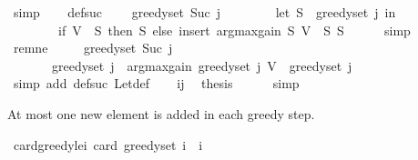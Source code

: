 \begin{isabellebody}
\ simp\isanewline
\isanewline
\ \ \isamarkupfalse%
\ def{\isacharunderscore}{\kern0pt}suc{\isacharcolon}{\kern0pt}\isanewline
\ \ \ \ {\isachardoublequoteopen}greedy{\isacharunderscore}{\kern0pt}set\ {\isacharparenleft}{\kern0pt}Suc\ j{\isacharparenright}{\kern0pt}\ {\isacharequal}{\kern0pt}\isanewline
\ \ \ \ \ \ \ {\isacharparenleft}{\kern0pt}let\ S\ {\isacharequal}{\kern0pt}\ greedy{\isacharunderscore}{\kern0pt}set\ j\ in\isanewline
\ \ \ \ \ \ \ \ if\ V\ {\isasymsubseteq}\ S\ then\ S\ else\ insert\ {\isacharparenleft}{\kern0pt}argmax{\isacharunderscore}{\kern0pt}gain\ S\ {\isacharparenleft}{\kern0pt}V\ {\isacharminus}{\kern0pt}\ S{\isacharparenright}{\kern0pt}{\isacharparenright}{\kern0pt}\ S{\isacharparenright}{\kern0pt}{\isachardoublequoteclose}\isanewline
\ \ \ \ \isamarkupfalse%
\ simp\isanewline
\isanewline
\ \ \isamarkupfalse%
\ rem{\isacharunderscore}{\kern0pt}ne\ \isamarkupfalse%
\isanewline
\ \ \ \ {\isachardoublequoteopen}greedy{\isacharunderscore}{\kern0pt}set\ {\isacharparenleft}{\kern0pt}Suc\ j{\isacharparenright}{\kern0pt}\ {\isacharequal}{\kern0pt}\isanewline
\ \ \ \ \ \ \ greedy{\isacharunderscore}{\kern0pt}set\ j\ {\isasymunion}\ {\isacharbraceleft}{\kern0pt}argmax{\isacharunderscore}{\kern0pt}gain\ {\isacharparenleft}{\kern0pt}greedy{\isacharunderscore}{\kern0pt}set\ j{\isacharparenright}{\kern0pt}\ {\isacharparenleft}{\kern0pt}V\ {\isacharminus}{\kern0pt}\ greedy{\isacharunderscore}{\kern0pt}set\ j{\isacharparenright}{\kern0pt}{\isacharbraceright}{\kern0pt}{\isachardoublequoteclose}\isanewline
\ \ \ \ \isamarkupfalse%
\ {\isacharparenleft}{\kern0pt}simp\ add{\isacharcolon}{\kern0pt}\ def{\isacharunderscore}{\kern0pt}suc\ Let{\isacharunderscore}{\kern0pt}def{\isacharparenright}{\kern0pt}\isanewline
\isanewline
\ \ \isamarkupfalse%
\ ij\ \isamarkupfalse%
\ {\isacharquery}{\kern0pt}thesis\isanewline
\ \ \ \ \isamarkupfalse%
\ simp\isanewline
{}\isamarkupfalse%
%
\endisatagproof
{\isafoldproof}%
%
\isadelimproof
%
\endisadelimproof
%
\begin{isamarkuptext}%
At most one new element is added in each greedy step.%
\end{isamarkuptext}\isamarkuptrue%
\isamarkupfalse%
\ card{\isacharunderscore}{\kern0pt}greedy{\isacharunderscore}{\kern0pt}le{\isacharunderscore}{\kern0pt}i{\isacharcolon}{\kern0pt}\ {\isachardoublequoteopen}card\ {\isacharparenleft}{\kern0pt}greedy{\isacharunderscore}{\kern0pt}set\ i{\isacharparenright}{\kern0pt}\ {\isasymle}\ i{\isachardoublequoteclose}\isanewline

\end{isabellebody}

